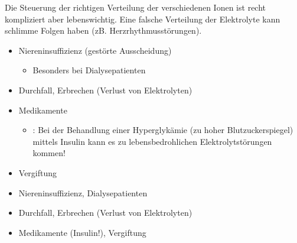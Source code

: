 
Die Steuerung der richtigen Verteilung der verschiedenen
Ionen ist recht kompliziert aber lebenswichtig. Eine
falsche Verteilung der Elektrolyte kann schlimme Folgen
haben (zB. Herzrhythmusstörungen).


{%
\label{topic:elektrolytstoerungen}
\label{topic:dialyse-elektrolyte}
%
\begin{itemize}
    \item Niereninsuffizienz (gestörte Ausscheidung)
    \begin{itemize}
        \item Besonders bei
        Dialysepatienten
    \end{itemize}
    \item Durchfall, Erbrechen (Verlust von Elektrolyten)
    \item Medikamente
    \begin{itemize}
      \item {}: Bei
      der Behandlung einer Hyperglykämie (zu hoher Blutzuckerspiegel) 
      mittels Insulin kann es
      zu lebensbedrohlichen Elektrolytstörungen kommen!
    \end{itemize}
    \item Vergiftung
\end{itemize}
}{%
\begin{itemize}
    \item Niereninsuffizienz, Dialysepatienten
    \item Durchfall, Erbrechen (Verlust von Elektrolyten)
    \item Medikamente (Insulin!), Vergiftung
\end{itemize}
}{}{}{}



\bigskip
